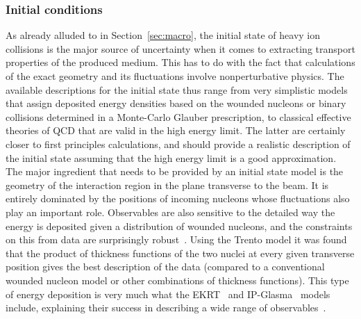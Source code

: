 



\subsubsection{Initial conditions} \label{sec:initialstate}
As already alluded to in Section~\ref{sec:macro}, the initial state of 
  heavy ion collisions is the major source of uncertainty when it comes 
  to extracting transport properties of the produced medium. 
This has to do with the fact that calculations of the exact geometry and 
  its fluctuations involve nonperturbative physics. 
The available descriptions for the initial state thus range from very 
  simplistic models that assign deposited energy densities based on the 
  wounded nucleons or binary collisions determined in a Monte-Carlo 
  Glauber prescription, to classical effective theories of QCD that are 
  valid in the high energy limit. 
The latter are certainly closer to first principles calculations, and 
  should provide a realistic description of the initial state assuming 
  that the high energy limit is a good approximation.
The major ingredient that needs to be provided by an initial state model 
  is the geometry of the interaction region in the plane transverse 
  to the beam. 
It is entirely dominated by the positions of incoming nucleons whose 
  fluctuations also play an important role. 
Observables are also sensitive to the detailed way the energy is deposited 
  given a distribution of wounded nucleons, and the constraints on this 
  from data are surprisingly robust~\cite{Moreland:2018gsh}. 
Using the Trento model it was found that the product of thickness functions 
  of the two nuclei at every given transverse position gives the best description 
  of the data (compared to a conventional wounded nucleon model or other 
  combinations of thickness functions). 
This type of energy deposition is very much what the EKRT~\cite{Niemi:2015qia} 
  and IP-Glasma~\cite{Schenke:2012wb,Schenke:2012fw} models include, explaining 
  their success in describing a wide range of observables~\cite{Niemi:2015qia,Gale:2012rq}.
